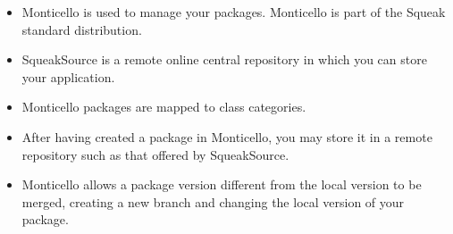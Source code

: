 \documentclass[a4paper,10pt,twoside]{book}
\begin{document}
\begin{itemize}
\item Monticello is used to manage your packages. Monticello is part of the Squeak standard distribution.

\item SqueakSource is a remote online central repository in which you can store your application.

\item Monticello packages are mapped to class categories. 

\item After having created a package in Monticello, you may store it in a remote repository such as that offered by SqueakSource.

\item Monticello allows a package version different from the local version to be merged, creating a new branch and changing the local version of your package.
\end{itemize}




\end{document}
